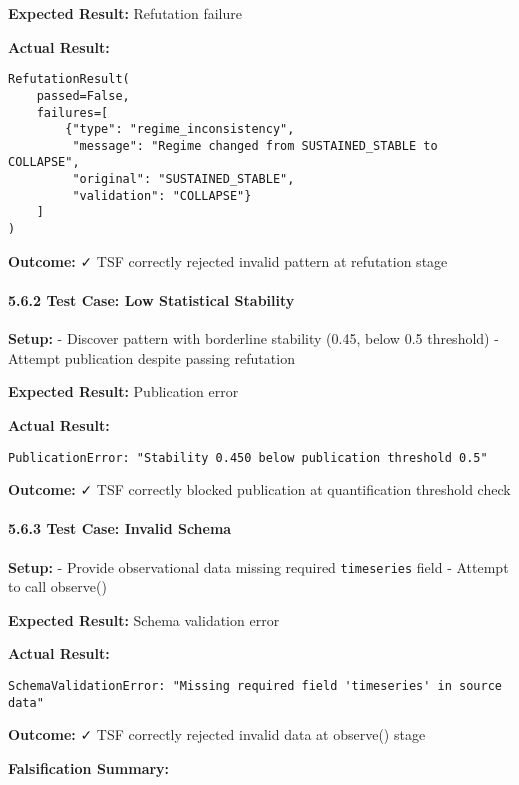\documentclass[
]{article}
\begin{document}
\textbf{Expected Result:} Refutation failure

\textbf{Actual Result:}

\begin{verbatim}
RefutationResult(
    passed=False,
    failures=[
        {"type": "regime_inconsistency",
         "message": "Regime changed from SUSTAINED_STABLE to COLLAPSE",
         "original": "SUSTAINED_STABLE",
         "validation": "COLLAPSE"}
    ]
)
\end{verbatim}

\textbf{Outcome:} ✓ TSF correctly rejected invalid pattern at refutation
stage

\paragraph{5.6.2 Test Case: Low Statistical
Stability}\label{test-case-low-statistical-stability}

\textbf{Setup:} - Discover pattern with borderline stability (0.45,
below 0.5 threshold) - Attempt publication despite passing refutation

\textbf{Expected Result:} Publication error

\textbf{Actual Result:}

\begin{verbatim}
PublicationError: "Stability 0.450 below publication threshold 0.5"
\end{verbatim}

\textbf{Outcome:} ✓ TSF correctly blocked publication at quantification
threshold check

\paragraph{5.6.3 Test Case: Invalid
Schema}\label{test-case-invalid-schema}

\textbf{Setup:} - Provide observational data missing required
\texttt{timeseries} field - Attempt to call observe()

\textbf{Expected Result:} Schema validation error

\textbf{Actual Result:}

\begin{verbatim}
SchemaValidationError: "Missing required field 'timeseries' in source data"
\end{verbatim}

\textbf{Outcome:} ✓ TSF correctly rejected invalid data at observe()
stage

\textbf{Falsification Summary:}
\end{document}
